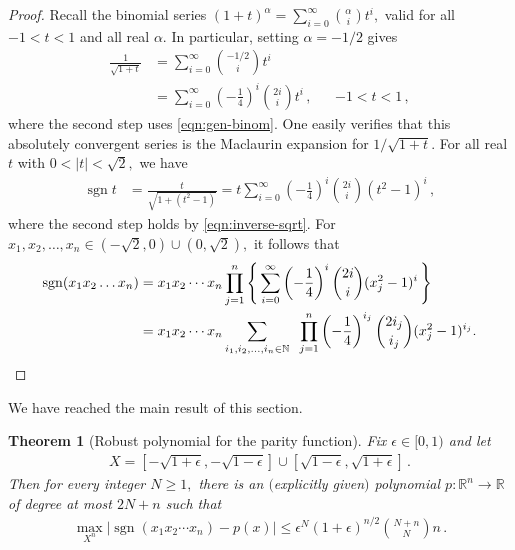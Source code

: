 \documentclass[10pt]{article}
\newtheorem{theorem}{Theorem}[section]
\theoremstyle{definition}
\numberwithin{equation}{section}
\newcommand{\R}{{\mathbb R}}
\newcommand{\PARENS}[1]{\left(#1\right)}
\DeclareMathOperator{\sign}{sgn}
\begin{document}
\begin{proof}
Recall the binomial series 
$(1+t)^{\alpha} = \sum_{i=0}^\infty {\alpha \choose i}
t^i,$
valid for all $-1<t<1$
and all real $\alpha$. In particular, setting
$\alpha=-1/2$ gives
\begin{align}
\frac{1}{\sqrt{1+t}} 
   &= \sum_{i=0}^\infty {-1/2 \choose i} t^i \nonumber \\
   &= \sum_{i=0}^\infty \PARENS{-\frac14}^i {2i\choose i} t^i\,, 
   		&& -1<t<1\,,
\label{eqn:inverse-sqrt}
\end{align}
where the second step uses \eqref{eqn:gen-binom}. One easily verifies that this absolutely 
convergent series is the Maclaurin
expansion for $1/\sqrt{1+t}$. For all real $t$ with
$0<|t|<\sqrt 2,$ we have
\begin{align}
 \sign t &= \frac t{\sqrt{1 + (t^2-1)}}
  = t\sum_{i=0}^\infty \PARENS{-\frac14}^i {2i \choose i} (t^2-1)^i\,,
  \label{eqn:sign-approx-maclaurin}
\end{align}
where the second step holds by
\eqref{eqn:inverse-sqrt}. For 
$x_1,x_2,\dots,x_n\in(-\sqrt 2,0)\cup(0,\sqrt 2),$ 
it follows that
\begin{align*}
\sign(x_1x_2\dots x_n)
  &= x_1x_2\cdots x_n \prod_{j=1}^n \left\{\,\sum_{i=0}^\infty 
       \PARENS{-\frac14}^i{2i \choose i} (x_j^2-1)^i
	   \,\right\}  \\
  &= x_1x_2\cdots x_n \sum_{i_1,i_2,\dots,i_n\in\mathbb N}
  \;\; \prod_{j=1}^n
  \PARENS{-\frac14}^{i_j}{2i_j\choose i_j}(x_j^2-1)^{i_j}. 
  \qedhere
\end{align*}
\end{proof}


We have reached the main result of this section.

\begin{theorem}[Robust polynomial for the parity function]
\label{thm:parity-robust}
Fix $\epsilon\in[0,1)$ and let
\begin{align*}
X=[-\sqrt{1+\epsilon},-\sqrt{1-\epsilon}]\cup
         [\sqrt{1-\epsilon},\sqrt{1+\epsilon}]\,. 
\end{align*}
Then for every integer $N\geq1,$ there is an
$($explicitly given$)$
polynomial $p\colon\R^n\to\R$ of degree at most
$2N+n$ such that 
\begin{align}
   \max_{X^n}|\sign(x_1x_2\cdots x_n)-p(x)| \leq
   \epsilon^N(1+\epsilon)^{n/2}{N+n\choose N}n\,.
   \label{eqn:parity-error-bound}
\end{align}
\end{theorem}
\end{document}
